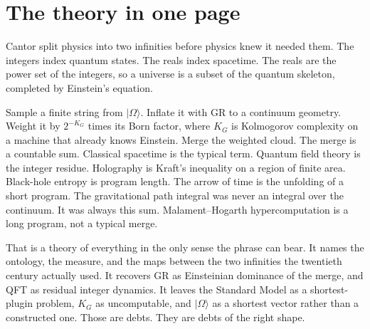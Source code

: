 \documentclass[11pt,a4paper]{article}
\theoremstyle{plain}
\theoremstyle{definition}
\theoremstyle{remark}
\newcommand{\KG}{K_{G}}
\newcommand{\ket}[1]{\lvert#1\rangle}
\begin{document}
\section{The theory in one page}

Cantor split physics into two infinities before physics knew it needed them.
The integers index quantum states.
The reals index spacetime.
The reals are the power set of the integers, so a universe is a subset of the quantum skeleton, completed by Einstein's equation.

Sample a finite string from $\ket{\Omega}$.
Inflate it with GR to a continuum geometry.
Weight it by $2^{-\KG}$ times its Born factor, where $\KG$ is Kolmogorov complexity on a machine that already knows Einstein.
Merge the weighted cloud.
The merge is a countable sum.
Classical spacetime is the typical term.
Quantum field theory is the integer residue.
Holography is Kraft's inequality on a region of finite area.
Black-hole entropy is program length.
The arrow of time is the unfolding of a short program.
The gravitational path integral was never an integral over the continuum.
It was always this sum.
Malament--Hogarth hypercomputation is a long program, not a typical merge.

That is a theory of everything in the only sense the phrase can bear.
It names the ontology, the measure, and the maps between the two infinities the twentieth century actually used.
It recovers GR as Einsteinian dominance of the merge, and QFT as residual integer dynamics.
It leaves the Standard Model as a shortest-plugin problem, $\KG$ as uncomputable, and $\ket{\Omega}$ as a shortest vector rather than a constructed one.
Those are debts.
They are debts of the right shape.
\end{document}
